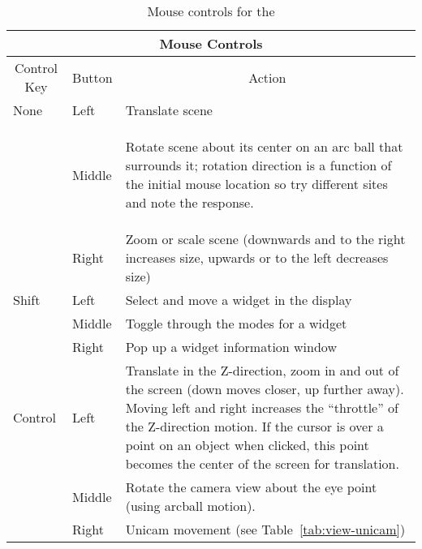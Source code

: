 \begin{table}[htb]
\begin{center}
  \begin{tabular}{|l|l|p{5in}|} \hline
    \multicolumn{3}{|c|}{\large Mouse Controls}\\ \hline \hline 
    \multicolumn{1}{|c|}{Control Key} & 
    \multicolumn{1}{|c|}{Button} & 
    \multicolumn{1}{|c|}{Action}\\ \hline
None & Left & Translate scene \\
     & Middle & \begin{raggedleft} Rotate scene about its center on an arc
    ball that surrounds it; rotation direction is a function of the
    initial mouse location so try different sites and note the
    response. \end{raggedleft}\\  
     & Right & Zoom or scale scene (downwards and to the right increases
     size, upwards or to the left decreases size) \\ \hline
Shift & Left & Select and move a widget in the display \\
      & Middle & Toggle through the modes for a widget \\
      & Right & Pop up a widget information window \\ \hline
Control & Left & Translate in the Z-direction, \ie{} zoom in and out of the
    screen (down moves closer, up further away).  Moving left and
    right increases the ``throttle'' of the Z-direction motion.  If
    the cursor is over a point on an object when clicked, this point
    becomes the center of the screen for translation.\\ 
      & Middle & Rotate the camera view about the eye point (using arcball
    motion). \\ 
      & Right & Unicam movement (see Table~\ref{tab:view-unicam})\\ \hline
\end{tabular}
\caption{\label{tab:view-mouse} Mouse controls for the \viewer{}}
\end{center}
\end{table}

\bigskip


